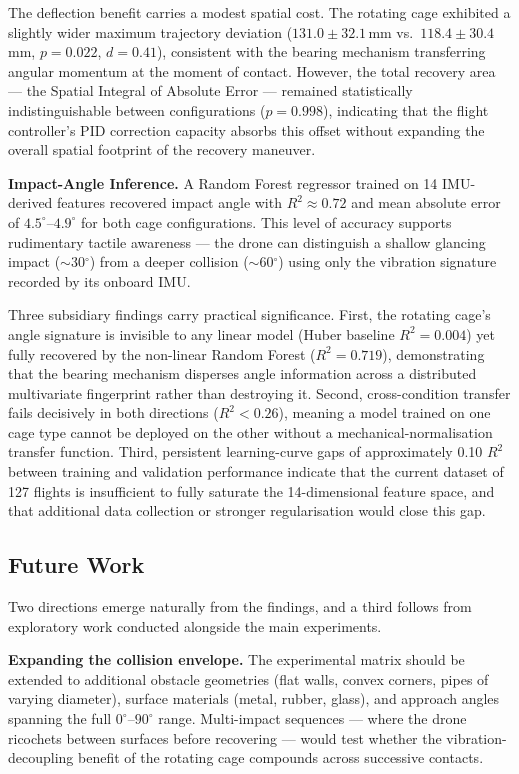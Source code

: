 The deflection benefit carries a modest spatial cost. The rotating cage exhibited a slightly wider maximum trajectory deviation ($131.0 \pm 32.1$\,mm vs.\ $118.4 \pm 30.4$\,mm, $p = 0.022$, $d = 0.41$), consistent with the bearing mechanism transferring angular momentum at the moment of contact. However, the total recovery area --- the Spatial Integral of Absolute Error --- remained statistically indistinguishable between configurations ($p = 0.998$), indicating that the flight controller's PID correction capacity absorbs this offset without expanding the overall spatial footprint of the recovery maneuver.

\textbf{Impact-Angle Inference.} A Random Forest regressor trained on 14 IMU-derived features recovered impact angle with $R^2 \approx 0.72$ and mean absolute error of $4.5^\circ$--$4.9^\circ$ for both cage configurations. This level of accuracy supports rudimentary tactile awareness --- the drone can distinguish a shallow glancing impact ($\sim$30$^\circ$) from a deeper collision ($\sim$60$^\circ$) using only the vibration signature recorded by its onboard IMU.

Three subsidiary findings carry practical significance. First, the rotating cage's angle signature is invisible to any linear model (Huber baseline $R^2 = 0.004$) yet fully recovered by the non-linear Random Forest ($R^2 = 0.719$), demonstrating that the bearing mechanism disperses angle information across a distributed multivariate fingerprint rather than destroying it. Second, cross-condition transfer fails decisively in both directions ($R^2 < 0.26$), meaning a model trained on one cage type cannot be deployed on the other without a mechanical-normalisation transfer function. Third, persistent learning-curve gaps of approximately 0.10 $R^2$ between training and validation performance indicate that the current dataset of 127 flights is insufficient to fully saturate the 14-dimensional feature space, and that additional data collection or stronger regularisation would close this gap.

\subsection{Future Work}

Two directions emerge naturally from the findings, and a third follows from exploratory work conducted alongside the main experiments.

\textbf{Expanding the collision envelope.} The experimental matrix should be extended to additional obstacle geometries (flat walls, convex corners, pipes of varying diameter), surface materials (metal, rubber, glass), and approach angles spanning the full $0^\circ$--$90^\circ$ range. Multi-impact sequences --- where the drone ricochets between surfaces before recovering --- would test whether the vibration-decoupling benefit of the rotating cage compounds across successive contacts.

